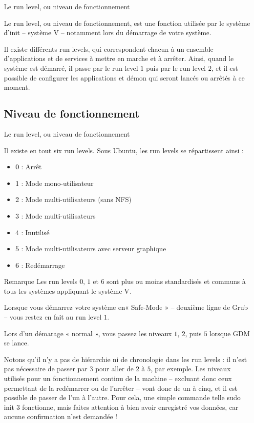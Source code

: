 \documentclass[10pt]{beamer}
\begin{document}
\begin{frame}{Le run level, ou niveau de fonctionnement}
\begin{definition}
Le run level, ou niveau de fonctionnement, est une fonction utilisée par le système
d'init – système V – notamment lors du démarrage de votre système.

Il existe différents run levels, qui correspondent chacun à un ensemble d’applications et de services à mettre en marche et à arrêter. Ainsi, quand le système est démarré, il passe par le run level $1$ puis par le run level $2$, et il est possible de configurer les applications et démon qui seront lancés ou arrêtés à ce moment.
\end{definition}
\end{frame}

\subsection{Niveau de fonctionnement}
\begin{frame}{Le run level, ou niveau de fonctionnement}

Il existe en tout six run levels. Sous Ubuntu, les run levels se répartissent ainsi :
\begin{itemize}
\item 0 : Arrêt
\item 1 : Mode mono-utilisateur
\item 2 : Mode multi-utilisateurs (sans NFS)
\item 3 : Mode multi-utilisateurs
\item 4 : Inutilisé
\item 5 : Mode multi-utilisateurs avec serveur graphique
\item 6 : Redémarrage
\end{itemize}
\end{frame}

\begin{frame}
\begin{alertblock}{Remarque}
Les run levels $0$, $1$ et $6$ sont plus ou moins standardisés et communs à tous les
systèmes appliquant le système V. 

Lorsque vous démarrez votre système en« Safe-Mode » – deuxième ligne de Grub – vous restez en fait au run level $1$. 

Lors d'un démarage « normal », vous passez les niveaux $1$, $2$, puis $5$ lorsque GDM se lance.

Notons qu'il n'y a pas de hiérarchie ni de chronologie dans les run levels : il n'est
pas nécessaire de passer par $3$ pour aller de $2$ à $5$, par exemple. Les niveaux
utilisés pour un fonctionnement continu de la machine – excluant donc ceux
permettant de la redémarrer ou de l'arrêter – vont donc de un à cinq, et il est
possible de passer de l'un à l'autre. Pour cela, une simple commande telle sudo \alert{init} $3$ fonctionne, mais faites attention à bien avoir enregistré vos données, car aucune confirmation n'est demandée !
\end{alertblock}
\end{frame}
\end{document}
